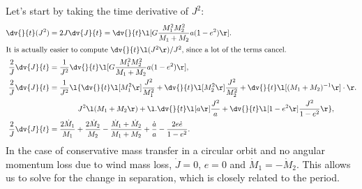 \documentclass[a4paper,10pt]{article}
\begin{document}
Let's start by taking the time derivative of \(J^{2}\):
\begin{align*}
    \dv{}{t}(J^{2}) &= 2 J \dv{J}{t} = \dv{}{t}\l[G \frac{M_{1}^{2} M_{2}^{2}}{M_{1} + M_{2} }a(1 -e^{2})\r].\\
    \intertext{It is actually easier to compute \(\dv{}{t}\l(J^{2}\r) / J^{2}\), since a lot of the terms cancel.}
    \frac{2}{J}\dv{J}{t} &= \frac{1}{J^{2}}\dv{}{t}\l[G \frac{M_{1}^{2} M_{2}^{2}}{M_{1} + M_{2} }a(1 -e^{2})\r],\\
    \frac{2}{J}\dv{J}{t} &= \frac{1}{J^{2}}\l\{\dv{}{t}\l[M_{1}^{2}\r] \frac{J^{2}}{M_{1}^{2}}  + \dv{}{t}\l[M_{2}^{2}\r] \frac{J^{2}}{M_{2}^{2}} + \dv{}{t}\l[(M_{1} + M_{2})^{-1} \r]  \cdot  \r.\\
                         & \phantom{=\frac{1}{J^{2}}\;\;\;\;\;}J^{2}\l(M_{1} + M_{2}\r) + \l.\dv{}{t}\l[a\r] \frac{J^{2}}{a} + \dv{}{t}\l[1- e^{2}\r] \frac{J^{2}}{1-e^{2} } \r\},\\
    \frac{2}{J}\dv{J}{t} &= \frac{2 \dot{M}_\text{1}}{M_{1}} + \frac{2 \dot{M}_\text{2}}{M_{2}} - \frac{\dot{M}_{1} + \dot{M}_{2}}{M_{1} + M_{2}} + \frac{\dot{a}}{a} -\frac{2 e\dot{e}}{1-e^{2}}.
\end{align*}
In the case of conservative mass transfer in a circular orbit and no angular momentum loss due to wind mass loss, \(\dot{J}  = 0\), \(e =0\) and \(\dot{M}_{1} = - \dot{M}_{2}\). This allows us to solve for the change in separation, which is closely related to the period.
\end{document}
